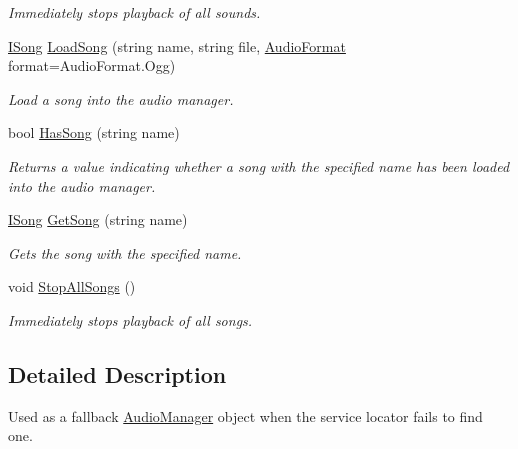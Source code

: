 \begin{DoxyCompactItemize}
\begin{DoxyCompactList}\small\item\em Immediately stops playback of all sounds. \end{DoxyCompactList}\item 
\hyperlink{interface_tri_devs_1_1_tri_engine2_d_1_1_audio_1_1_i_song}{I\-Song} \hyperlink{class_tri_devs_1_1_tri_engine2_d_1_1_audio_1_1_null_audio_manager_a95b4ea37a41d2acd66a24eb8b257c830}{Load\-Song} (string name, string file, \hyperlink{namespace_tri_devs_1_1_tri_engine2_d_1_1_audio_ae238794863562d9b6204219dd29019ff}{Audio\-Format} format=Audio\-Format.\-Ogg)
\begin{DoxyCompactList}\small\item\em Load a song into the audio manager. \end{DoxyCompactList}\item 
bool \hyperlink{class_tri_devs_1_1_tri_engine2_d_1_1_audio_1_1_null_audio_manager_a2cd559546de7e0f923f64e0a749d8b4d}{Has\-Song} (string name)
\begin{DoxyCompactList}\small\item\em Returns a value indicating whether a song with the specified name has been loaded into the audio manager. \end{DoxyCompactList}\item 
\hyperlink{interface_tri_devs_1_1_tri_engine2_d_1_1_audio_1_1_i_song}{I\-Song} \hyperlink{class_tri_devs_1_1_tri_engine2_d_1_1_audio_1_1_null_audio_manager_abcbfb03fdf4bfaf2e11d2637ba52ebfa}{Get\-Song} (string name)
\begin{DoxyCompactList}\small\item\em Gets the song with the specified name. \end{DoxyCompactList}\item 
void \hyperlink{class_tri_devs_1_1_tri_engine2_d_1_1_audio_1_1_null_audio_manager_a445ddef609ff3a06b25e31a97da55064}{Stop\-All\-Songs} ()
\begin{DoxyCompactList}\small\item\em Immediately stops playback of all songs. \end{DoxyCompactList}\end{DoxyCompactItemize}


\subsection{Detailed Description}
Used as a fallback \hyperlink{class_tri_devs_1_1_tri_engine2_d_1_1_audio_1_1_audio_manager}{Audio\-Manager} object when the service locator fails to find one. 



